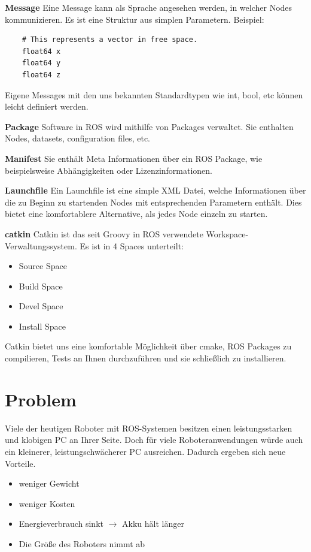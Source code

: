 \documentclass[12pt]{article}
\begin{document}
{\bf Message} Eine Message kann als Sprache angesehen werden, in welcher Nodes kommunizieren. Es ist eine Struktur aus simplen Parametern.
Beispiel:
\begin{verbatim}
	# This represents a vector in free space. 
	float64 x
	float64 y
	float64 z
\end{verbatim}
Eigene Messages mit den uns bekannten Standardtypen wie int, bool, etc können leicht definiert werden.

{\bf Package} Software in ROS wird mithilfe von Packages verwaltet.
Sie enthalten Nodes, datasets, configuration files, etc.

{\bf Manifest} Sie enthält Meta Informationen über ein ROS Package, wie beispielsweise Abhängigkeiten oder Lizenzinformationen.

{\bf Launchfile} Ein Launchfile ist eine simple XML Datei, welche Informationen über die zu Beginn zu startenden Nodes mit entsprechenden Parametern enthält.
Dies bietet eine komfortablere Alternative, als jedes Node einzeln zu starten.
 
{\bf catkin} Catkin ist das seit Groovy in ROS verwendete Workspace-Verwaltungssystem.
Es ist in 4 Spaces unterteilt:
\begin{itemize}
\item Source Space
\item Build Space
\item Devel Space
\item Install Space
\end{itemize}
Catkin bietet uns eine komfortable Möglichkeit über cmake, ROS Packages zu compilieren, Tests an Ihnen durchzuführen und sie schließlich zu installieren.

\section{Problem}

Viele der heutigen Roboter mit ROS-Systemen besitzen einen leistungsstarken und klobigen PC an Ihrer Seite.
Doch für viele Roboteranwendungen würde auch ein kleinerer, leistungschwächerer PC ausreichen.
Dadurch ergeben sich neue Vorteile.

\begin{itemize}
\item weniger Gewicht
\item weniger Kosten
\item Energieverbrauch sinkt $\rightarrow$ Akku hält länger
\item Die Größe des Roboters nimmt ab
\end{itemize}
\end{document}

